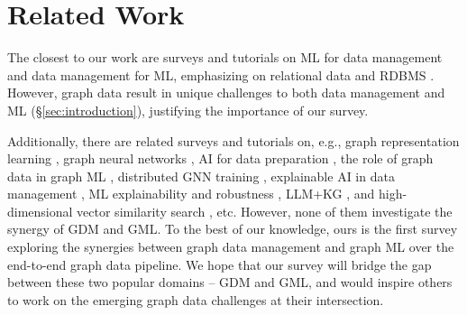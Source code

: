 \section{Related Work}
\label{sec:related}

\medskip
\medskip

The closest to our work are surveys and tutorials on ML for data management
and data management for ML, emphasizing on relational
data and RDBMS \cite{ChaiWLNL23,
Kumar0017,Polyzotis0WZ17,HulsebosDSP23}.
However, graph data result in unique challenges to both data management and ML (\S\ref{sec:introduction}), justifying the importance of our survey.


Additionally, there are related surveys and tutorials on, e.g., graph representation learning \cite{CaiZC18,CuiWPZ19}, graph neural networks \cite{WuPCLZY21,ZhangCZ22,ma2021deep}, AI for data preparation \cite{Chai0FL23}, the role of graph data in graph ML \cite{abs-2309-10979}, distributed GNN training \cite{ShaoLGYLMZCC24}, explainable AI in data management \cite{PradhanLGS22}, ML explainability and robustness \cite{DattaFLLSW21}, LLM+KG \cite{PanLWCWW24}, and high-dimensional vector similarity search \cite{EchihabiPZ21}, etc.
However, none of them investigate the synergy of GDM and GML. To the best of our knowledge, ours is the first survey exploring the synergies between graph data management and graph ML over the end-to-end graph data pipeline. We hope that our survey will bridge the gap between these two popular domains -- GDM and GML, and would inspire others to work on the emerging graph data challenges at their intersection.